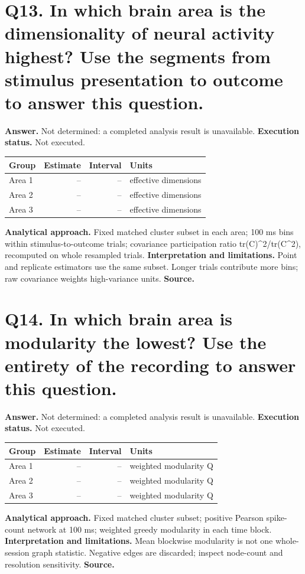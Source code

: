 \documentclass[11pt,a4paper]{article}
\begin{document}
\section*{Q13. In which brain area is the dimensionality of neural activity highest? Use the segments from stimulus presentation to outcome to answer this question.}
\textbf{Answer.} Not determined: a completed analysis result is unavailable.
\textbf{Execution status.} Not executed.
\begin{tabularx}{\linewidth}{XrrX}\toprule Group & Estimate & Interval & Units \\\midrule
Area 1 & -- & -- & effective dimensions \\
Area 2 & -- & -- & effective dimensions \\
Area 3 & -- & -- & effective dimensions \\
\bottomrule\end{tabularx}
\textbf{Analytical approach.} Fixed matched cluster subset in each area; 100 ms bins within stimulus-to-outcome trials; covariance participation ratio tr(C)\textasciicircum{}2/tr(C\textasciicircum{}2), recomputed on whole resampled trials.
\textbf{Interpretation and limitations.} Point and replicate estimators use the same subset. Longer trials contribute more bins; raw covariance weights high-variance units.
\textbf{Source.} 
\clearpage
\section*{Q14. In which brain area is modularity the lowest? Use the entirety of the recording to answer this question.}
\textbf{Answer.} Not determined: a completed analysis result is unavailable.
\textbf{Execution status.} Not executed.
\begin{tabularx}{\linewidth}{XrrX}\toprule Group & Estimate & Interval & Units \\\midrule
Area 1 & -- & -- & weighted modularity Q \\
Area 2 & -- & -- & weighted modularity Q \\
Area 3 & -- & -- & weighted modularity Q \\
\bottomrule\end{tabularx}
\textbf{Analytical approach.} Fixed matched cluster subset; positive Pearson spike-count network at 100 ms; weighted greedy modularity in each time block.
\textbf{Interpretation and limitations.} Mean blockwise modularity is not one whole-session graph statistic. Negative edges are discarded; inspect node-count and resolution sensitivity.
\textbf{Source.} 
\clearpage
\end{document}
